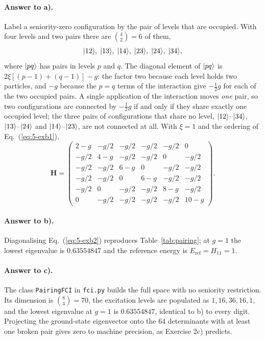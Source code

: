 \paragraph{Answer to a).}
Label a seniority-zero configuration by the pair of levels that are occupied.
With four levels and two pairs there are $\binom{4}{2}=6$ of them,
\begin{equation}
  \vert 12 \rangle,\;\vert 13 \rangle,\;\vert 14 \rangle,\;\vert 23 \rangle,\;\vert 24 \rangle,\;\vert 34 \rangle,
  \label{eq:5-exb1}
\end{equation}
where $\vert pq \rangle$ has pairs in levels $p$ and $q$.  The diagonal element of
$\vert pq \rangle$ is $2\xi[(p-1)+(q-1)]-g$: the factor two because each level holds
two particles, and $-g$ because the $p=q$ terms of the interaction give
$-\tfrac12 g$ for each of the two occupied pairs.  A single application of the
interaction moves \emph{one} pair, so two configurations are connected by
$-\tfrac12 g$ if and only if they share exactly one occupied level; the three
pairs of configurations that share no level, $\vert 12 \rangle$--$\vert 34 \rangle$,
$\vert 13 \rangle$--$\vert 24 \rangle$ and $\vert 14 \rangle$--$\vert 23 \rangle$, are not connected at
all.  With $\xi=1$ and the ordering of Eq.~(\ref{eq:5-exb1}),
\begin{equation}
  \bm{H} =
  \begin{pmatrix}
    2-g & -g/2 & -g/2 & -g/2 & -g/2 & 0\\
    -g/2 & 4-g & -g/2 & -g/2 & 0 & -g/2\\
    -g/2 & -g/2 & 6-g & 0 & -g/2 & -g/2\\
    -g/2 & -g/2 & 0 & 6-g & -g/2 & -g/2\\
    -g/2 & 0 & -g/2 & -g/2 & 8-g & -g/2\\
    0 & -g/2 & -g/2 & -g/2 & -g/2 & 10-g
  \end{pmatrix}.
  \label{eq:5-exb2}
\end{equation}

\paragraph{Answer to b).}
Diagonalising Eq.~(\ref{eq:5-exb2}) reproduces Table~\ref{tab:pairing}; at
$g=1$ the lowest eigenvalue is $0.63554847$ and the reference energy is
$E_{\mathrm{ref}}=H_{11}=1$.

\paragraph{Answer to c).}
The class \texttt{PairingFCI} in \texttt{fci.py} builds the full space with no
seniority restriction.  Its dimension is $\binom{8}{4}=70$, the excitation
levels are populated as $1,16,36,16,1$, and the lowest eigenvalue at $g=1$ is
$0.63554847$, identical to b) to every digit.  Projecting the ground-state
eigenvector onto the $64$ determinants with at least one broken pair gives
zero to machine precision, as Exercise 2c) predicts.

